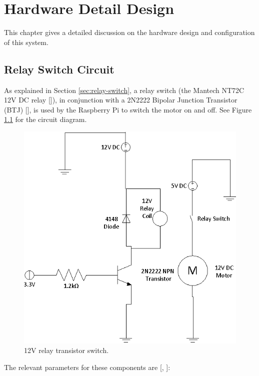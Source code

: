 \chapter{Hardware Detail Design}

This chapter gives a detailed discussion on the hardware design and
configuration of this system. 

\section{Relay Switch Circuit}
\label{sec:detail-switch}

As explained in Section \ref{sec:relay-switch}, a relay switch (the Mantech
NT72C 12V DC relay [\cite{manual:relay-specs}]), in conjunction with a 2N2222
Bipolar Junction Transistor (BTJ) [\cite{manual:transistor-datasheet}], is used
by the Raspberry Pi to switch the motor on and off. See Figure
\ref{fig:relay-switch} for the circuit diagram.

\begin{figure}[h]
\centering
\includegraphics[scale=0.7]{relay_switch.eps}
\caption{12V relay transistor switch. }
\label{fig:relay-switch}
\end{figure}

The relevant  parameters for these components are [\cite{manual:relay-specs},
\cite{manual:transistor-datasheet}]:

